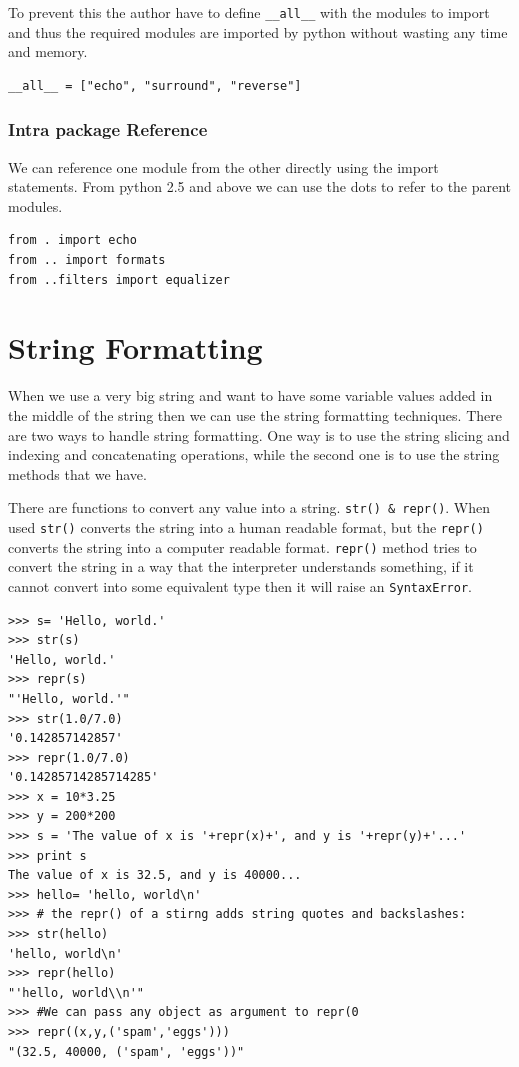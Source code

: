 \documentclass[12pt,a4paper]{article}
\begin{document}
To prevent this the author have to define \texttt{\_\_all\_\_} with the modules to import and thus the required modules are imported by python without wasting any time and memory. 

\begin{verbatim}
__all__ = ["echo", "surround", "reverse"]
\end{verbatim}
\subsubsection{Intra package Reference}
We can reference one module from the other directly using the import statements. From python 2.5 and above we can use the dots to refer to the parent modules.
\begin{verbatim}
from . import echo
from .. import formats
from ..filters import equalizer
\end{verbatim}

\section{String Formatting}
When we use a very big string and want to have some variable values added in the middle of the string then we can use the string formatting techniques. There are two ways to handle string formatting. One way is to use the string slicing and indexing and concatenating operations, while the second one is to use the string methods that we have. 

There are functions to convert any value into a string. \texttt{str() \& repr()}. When used \texttt{str()} converts the string into a human readable format, but the \texttt{repr()} converts the string into a computer readable format. \texttt{repr()} method tries to convert the string in a way that the interpreter understands something, if it cannot convert into some equivalent type then it will raise an \texttt{SyntaxError}.

\begin{verbatim}
>>> s= 'Hello, world.'
>>> str(s)
'Hello, world.'
>>> repr(s)
"'Hello, world.'"
>>> str(1.0/7.0)
'0.142857142857'
>>> repr(1.0/7.0)
'0.14285714285714285'
>>> x = 10*3.25
>>> y = 200*200
>>> s = 'The value of x is '+repr(x)+', and y is '+repr(y)+'...'
>>> print s
The value of x is 32.5, and y is 40000...
>>> hello= 'hello, world\n'
>>> # the repr() of a stirng adds string quotes and backslashes:
>>> str(hello)
'hello, world\n'
>>> repr(hello)
"'hello, world\\n'"
>>> #We can pass any object as argument to repr(0
>>> repr((x,y,('spam','eggs')))
"(32.5, 40000, ('spam', 'eggs'))"
\end{verbatim}
\end{document}
